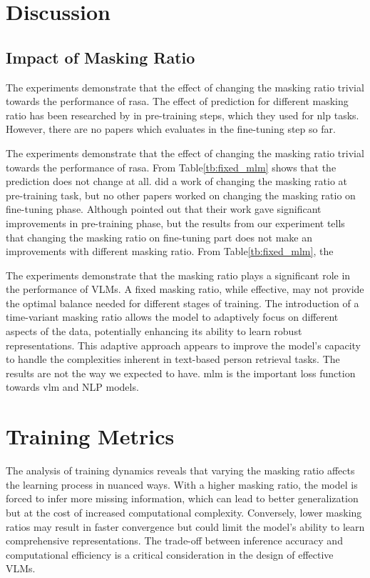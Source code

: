 \section{Discussion}
\subsection{Impact of Masking Ratio}

The experiments demonstrate that the effect of changing the masking ratio trivial towards the performance of \acrshort{rasa}. 
The effect of prediction for different masking ratio has been researched by \cite{yang2023learningbettermaskingbetter} in pre-training steps, which they used for \acrshort{nlp} tasks. However, there are no papers which evaluates in the fine-tuning step so far.


The experiments demonstrate that the effect of changing the masking ratio trivial towards the performance of \acrshort{rasa}. From Table\ref{tb:fixed_mlm} shows that the prediction does not change at all. \cite{yang2023learningbettermaskingbetter} did a work of changing the masking ratio at pre-training task, but no other papers worked on changing the masking ratio on fine-tuning phase. 
Although \cite{yang2023learningbettermaskingbetter} pointed out that their work gave significant improvements in pre-training phase, but the results from our experiment tells that changing the masking ratio on fine-tuning part does not make an improvements with different masking ratio.
From Table\ref{tb:fixed_mlm}, the 

The experiments demonstrate that the masking ratio plays a significant role in the performance of VLMs. A fixed masking ratio, while effective, may not provide the optimal balance needed for different stages of training. The introduction of a time-variant masking ratio allows the model to adaptively focus on different aspects of the data, potentially enhancing its ability to learn robust representations. This adaptive approach appears to improve the model's capacity to handle the complexities inherent in text-based person retrieval tasks.
The results are not the way we expected to have. \acrshort{mlm} is the important loss function towards \acrshort{vlm} and NLP models. 


\section{Training Metrics}

The analysis of training dynamics reveals that varying the masking ratio affects the learning process in nuanced ways. With a higher masking ratio, the model is forced to infer more missing information, which can lead to better generalization but at the cost of increased computational complexity. Conversely, lower masking ratios may result in faster convergence but could limit the model's ability to learn comprehensive representations. The trade-off between inference accuracy and computational efficiency is a critical consideration in the design of effective VLMs.

